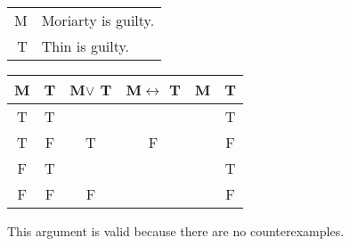 \begin{tabular}{r l}
    M & Moriarty is guilty. \\
    T & Thin is guilty.
\end{tabular}

\begin{tabular}{c|c||c|c|c||c}
    M & T & M$\lor$ T & M$\leftrightarrow$ T & M & T \\
    \hline
    T & T &   &   &   & T \\
    T & F & T & F &   & F \\
    F & T &   &   &   & T \\
    F & F & F &   &   & F
\end{tabular}

\noindent This argument is valid because there are no counterexamples.